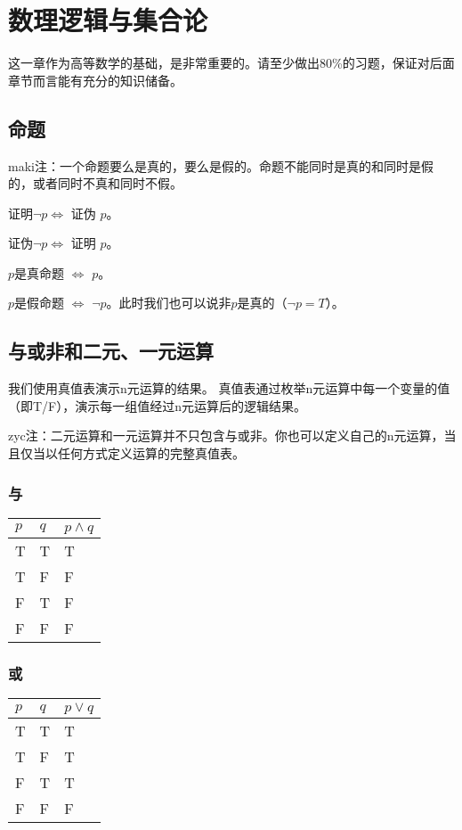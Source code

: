 
\section{数理逻辑与集合论}
这一章作为高等数学的基础，是非常重要的。请至少做出80\%的习题，保证对后面章节而言能有充分的知识储备。

\subsection{命题}
maki注：一个命题要么是真的，要么是假的。命题不能同时是真的和同时是假的，或者同时不真和同时不假。

证明$\neg p \iff$ 证伪 $p$。

证伪$\neg p \iff$ 证明 $p$。

$p$是真命题 $\iff$ $p$。

$p$是假命题 $\iff$ $\neg p$。此时我们也可以说非$p$是真的（$\neg p = T$）。

\subsection{与或非和二元、一元运算}

我们使用真值表演示n元运算的结果。
真值表通过枚举n元运算中每一个变量的值（即T/F），演示每一组值经过n元运算后的逻辑结果。

zyc注：二元运算和一元运算并不只包含与或非。你也可以定义自己的n元运算，当且仅当以任何方式定义运算的完整真值表。

\subsubsection{与}

\begin{table}[H]
    \begin{tabular}{ll|l}
    $p$ & $q$   & $p \wedge q$ \\ \hline 
    T   & T     & T            \\
    T   & F     & F            \\
    F   & T     & F            \\
    F   & F     & F                        
    \end{tabular}
\end{table}

\subsubsection{或}

\begin{table}[H]
    \begin{tabular}{ll|l}
    $p$ & $q$   & $p \vee q$ \\ \hline 
    T   & T     & T            \\
    T   & F     & T            \\
    F   & T     & T            \\
    F   & F     & F                        
    \end{tabular}
\end{table}

